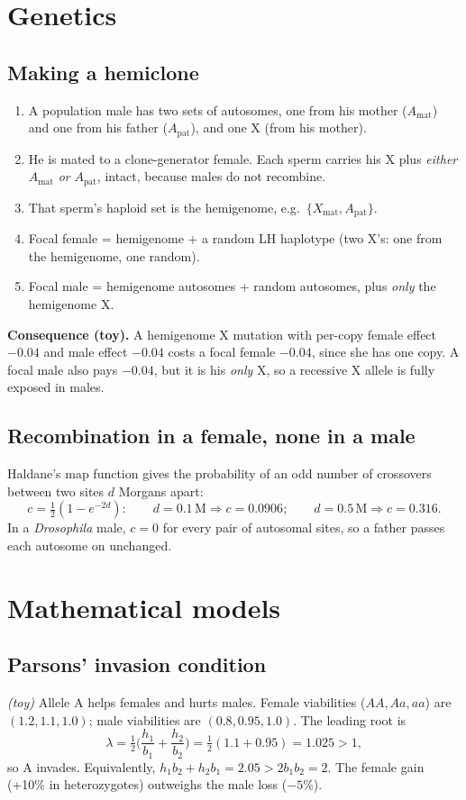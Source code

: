 \section{Genetics}
\subsection{Making a hemiclone}
\begin{enumerate}
\item A population male has two sets of autosomes, one from his mother ($A_\mathrm{mat}$) and one from his father ($A_\mathrm{pat}$), and one X (from his mother).
\item He is mated to a clone-generator female. Each sperm carries his X plus \emph{either} $A_\mathrm{mat}$ \emph{or} $A_\mathrm{pat}$, intact, because males do not recombine.
\item That sperm's haploid set is the hemigenome, e.g.\ $\{X_\mathrm{mat}, A_\mathrm{pat}\}$.
\item Focal female = hemigenome + a random LH haplotype (two X's: one from the hemigenome, one random).
\item Focal male = hemigenome autosomes + random autosomes, plus \emph{only} the hemigenome X.
\end{enumerate}
\textbf{Consequence (toy).} A hemigenome X mutation with per-copy female effect $-0.04$ and male effect $-0.04$ costs a focal female $-0.04$, since she has one copy. A focal male also pays $-0.04$, but it is his \emph{only} X, so a recessive X allele is fully exposed in males.

\subsection{Recombination in a female, none in a male}
Haldane's map function gives the probability of an odd number of crossovers between two sites $d$ Morgans apart:
\[
c=\tfrac12(1-e^{-2d}):\qquad d=0.1\,\mathrm{M}\Rightarrow c=0.0906;\qquad d=0.5\,\mathrm{M}\Rightarrow c=0.316.
\]
In a \emph{Drosophila} male, $c=0$ for every pair of autosomal sites, so a father passes each autosome on unchanged.

\section{Mathematical models}
\subsection{Parsons' invasion condition}
\emph{(toy)} Allele A helps females and hurts males. Female viabilities ($AA,Aa,aa$) are $(1.2,1.1,1.0)$; male viabilities are $(0.8,0.95,1.0)$. The leading root is
\[
\lambda=\tfrac12\Big(\frac{h_1}{b_1}+\frac{h_2}{b_2}\Big)=\tfrac12(1.1+0.95)=1.025>1,
\]
so A invades. Equivalently, $h_1b_2+h_2b_1=2.05>2b_1b_2=2$. The female gain (+10\% in heterozygotes) outweighs the male loss ($-5\%$).

